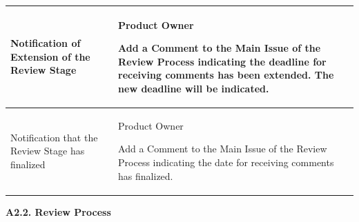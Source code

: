 \documentclass{template/openetcs_article}
\begin{document}
\begin{flushleft}
\begin{supertabular}{|m{3cm}|m{12cm}|}
Notification of Extension of the Review Stage &
\begin{description}
\item Product Owner\
\item Add a Comment to the Main Issue of the Review Process indicating the deadline for receiving comments has been extended. The new deadline will be indicated.
\end{description}\\\hline
Notification that the Review Stage has finalized &
\begin{description}
\item Product Owner\
\item Add a Comment to the Main Issue of the Review Process indicating the date for receiving comments has finalized.
\end{description} 
\\\hline
\end{supertabular}
\end{flushleft}

\textbf{A2.2. Review Process}
\end{document}

